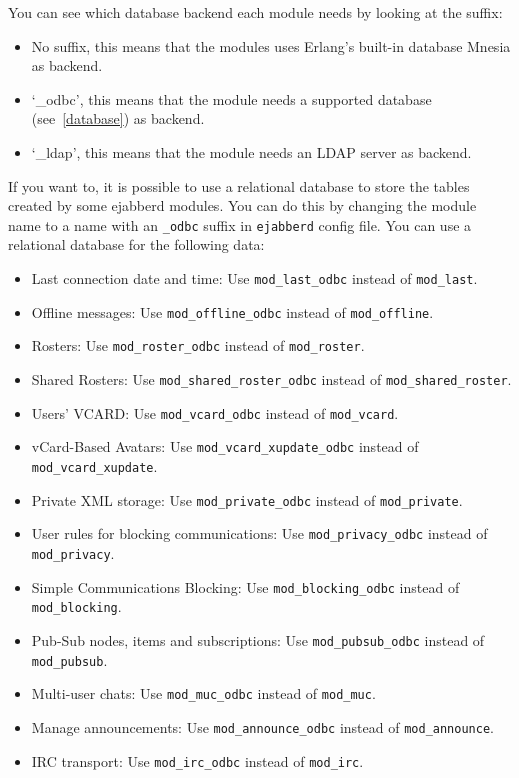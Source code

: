 \documentclass[a4paper,10pt]{book}
\newcommand{\term}[1]{\texttt{#1}}
\newcommand{\ejabberd}{\texttt{ejabberd}}
\begin{document}
You can see which database backend each module needs by looking at the suffix:
\begin{itemize}
\item No suffix, this means that the modules uses Erlang's built-in database
  Mnesia as backend.
\item `\_odbc', this means that the module needs a supported database
  (see~\ref{database}) as backend.
\item `\_ldap', this means that the module needs an LDAP server as backend.
\end{itemize}

If you want to,
it is possible to use a relational database to store the tables created by some ejabberd modules.
You can do this by changing the module name to a name with an
\term{\_odbc} suffix in \ejabberd{} config file. You can use a relational
database for the following data:

\begin{itemize}
\item Last connection date and time: Use \term{mod\_last\_odbc} instead of
  \term{mod\_last}.
\item Offline messages: Use \term{mod\_offline\_odbc} instead of
  \term{mod\_offline}.
\item Rosters: Use \term{mod\_roster\_odbc} instead of \term{mod\_roster}.
\item Shared Rosters: Use \term{mod\_shared\_roster\_odbc} instead of \term{mod\_shared\_roster}.
\item Users' VCARD: Use \term{mod\_vcard\_odbc} instead of \term{mod\_vcard}.
\item vCard-Based Avatars: Use \term{mod\_vcard\_xupdate\_odbc} instead of \term{mod\_vcard\_xupdate}.
\item Private XML storage: Use \term{mod\_private\_odbc} instead of \term{mod\_private}.
\item User rules for blocking communications: Use \term{mod\_privacy\_odbc} instead of \term{mod\_privacy}.
\item Simple Communications Blocking: Use \term{mod\_blocking\_odbc} instead of \term{mod\_blocking}.
\item Pub-Sub nodes, items and subscriptions: Use \term{mod\_pubsub\_odbc} instead of \term{mod\_pubsub}.
\item Multi-user chats: Use \term{mod\_muc\_odbc} instead of \term{mod\_muc}.
\item Manage announcements: Use \term{mod\_announce\_odbc} instead of \term{mod\_announce}.
\item IRC transport: Use \term{mod\_irc\_odbc} instead of \term{mod\_irc}.
\end{itemize}
\end{document}

